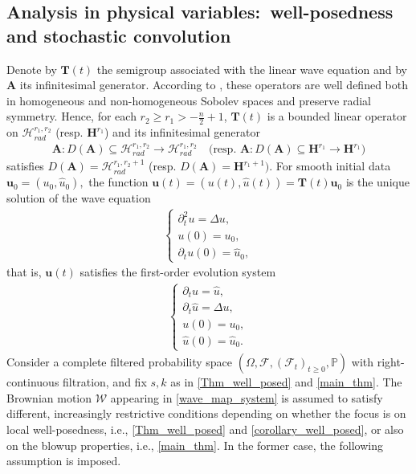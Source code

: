 \documentclass[12pt,reqno]{amsart}
\theoremstyle{plain}
\theoremstyle{remark}
\theoremstyle{plain}
\theoremstyle{definition}
\numberwithin{equation}{section}
\numberwithin{equation}{section}
\newcommand{\HH}{\mathcal{H}}
\begin{document}
\subsection{Analysis in physical variables:~well-posedness and stochastic convolution}\label{prel_physical}
Denote by $\mathbf{T}(t)$  the semigroup associated with the linear wave equation and by $\mathbf{A}$ its infinitesimal generator. According to \cite[Chapter 7.4]{pazy2012semigroups}, these operators are well defined both in homogeneous and non-homogeneous Sobolev spaces and preserve radial symmetry. Hence, for each $r_2\geq r_1> -\frac{n}{2}+1$, $\mathbf{T}(t)$ is a bounded linear operator on $\HH_{rad}^{r_1,r_2}$ (resp. $\mathbf{H}^{r_1}$) and its infinitesimal generator 
    \begin{align*}
    \mathbf{A}:D(\mathbf{A})\subseteq  \HH_{rad}^{r_1,r_2}\rightarrow \HH_{rad}^{r_1,r_2} \quad \text{(resp. } \mathbf{A}:D(\mathbf{A})\subseteq  \mathbf{H}^{r_1}\rightarrow \mathbf{H}^{r_1})
    \end{align*}
satisfies $D(\mathbf{A})=\HH_{rad}^{r_1,r_2+1}$ (resp. $D(\mathbf{A})=\mathbf{H}^{r_1+1})$. For smooth initial data $\mathbf{u}_0=(u_0,\hat{u}_0),$  the function $ \mathbf{u}(t)=(u(t),\hat{u}(t))=\mathbf{T}(t)\mathbf{u}_0$ is the unique solution of the wave equation
	\begin{align}\label{linear_wave_1}
		\begin{cases}
			\partial_t^2u=\Delta u,\\
			u(0)=u_0,\\
			\partial_tu(0)=\hat{u}_0,  
		\end{cases} 
	\end{align}
	that is, $\mathbf{u}(t)$ satisfies the first-order evolution system
\begin{align}\label{linear_wave_evolution}
		\begin{cases}
			\partial_t u=\hat{u},\\
			\partial_t \hat{u}=\Delta u,\\
			u(0)=u_{0},\\
			\hat{u}(0)=\hat{u}_0.
		\end{cases}
	\end{align}
	Consider a complete filtered probability space $(\Omega,\mathcal{F},(\mathcal{F}_t)_{t\geq 0},\mathbb{P})$ with right-continuous filtration, and fix $s, k$ as in \autoref{Thm_well_posed} and \autoref{main_thm}. The Brownian motion $\mathcal{W}$ appearing in \eqref{wave_map_system} is assumed to satisfy different, increasingly restrictive conditions depending on whether the focus is on local well-posedness, i.e., \autoref{Thm_well_posed} and \autoref{corollary_well_posed}, or also on the blowup properties, i.e., \autoref{main_thm}. In the former case, the following assumption is imposed.
\end{document}
